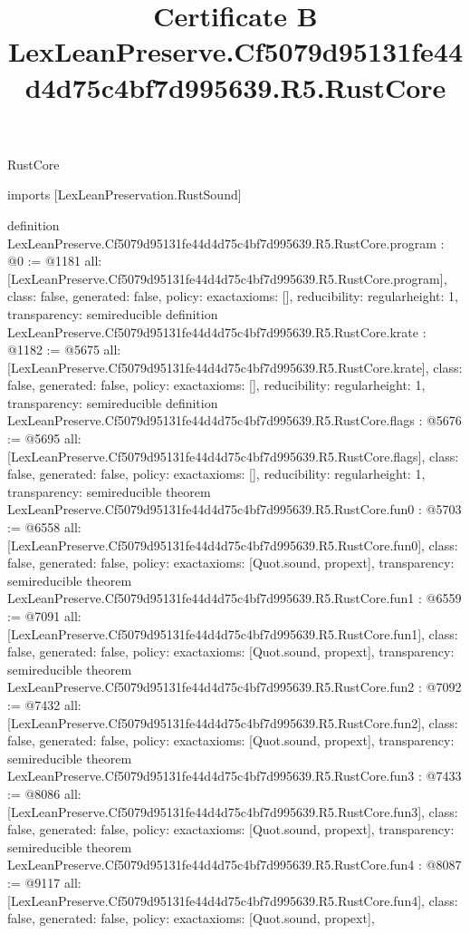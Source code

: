 \begin{lexlean}{RustCore}
\title{Certificate B LexLeanPreserve.Cf5079d95131fe44d4d75c4bf7d995639.R5.RustCore}
\begin{coremodule}
imports [LexLeanPreservation.RustSound]

definition LexLeanPreserve.Cf5079d95131fe44d4d75c4bf7d995639.R5.RustCore.program : @0 := @1181 {
  all: [LexLeanPreserve.Cf5079d95131fe44d4d75c4bf7d995639.R5.RustCore.program],
  class: false,
  generated: false,
  policy: exact{axioms: []},
  reducibility: regular{height: 1},
  transparency: semireducible
}
definition LexLeanPreserve.Cf5079d95131fe44d4d75c4bf7d995639.R5.RustCore.krate : @1182 := @5675 {
  all: [LexLeanPreserve.Cf5079d95131fe44d4d75c4bf7d995639.R5.RustCore.krate],
  class: false,
  generated: false,
  policy: exact{axioms: []},
  reducibility: regular{height: 1},
  transparency: semireducible
}
definition LexLeanPreserve.Cf5079d95131fe44d4d75c4bf7d995639.R5.RustCore.flags : @5676 := @5695 {
  all: [LexLeanPreserve.Cf5079d95131fe44d4d75c4bf7d995639.R5.RustCore.flags],
  class: false,
  generated: false,
  policy: exact{axioms: []},
  reducibility: regular{height: 1},
  transparency: semireducible
}
theorem LexLeanPreserve.Cf5079d95131fe44d4d75c4bf7d995639.R5.RustCore.fun0 : @5703 := @6558 {
  all: [LexLeanPreserve.Cf5079d95131fe44d4d75c4bf7d995639.R5.RustCore.fun0],
  class: false,
  generated: false,
  policy: exact{axioms: [Quot.sound, propext]},
  transparency: semireducible
}
theorem LexLeanPreserve.Cf5079d95131fe44d4d75c4bf7d995639.R5.RustCore.fun1 : @6559 := @7091 {
  all: [LexLeanPreserve.Cf5079d95131fe44d4d75c4bf7d995639.R5.RustCore.fun1],
  class: false,
  generated: false,
  policy: exact{axioms: [Quot.sound, propext]},
  transparency: semireducible
}
theorem LexLeanPreserve.Cf5079d95131fe44d4d75c4bf7d995639.R5.RustCore.fun2 : @7092 := @7432 {
  all: [LexLeanPreserve.Cf5079d95131fe44d4d75c4bf7d995639.R5.RustCore.fun2],
  class: false,
  generated: false,
  policy: exact{axioms: [Quot.sound, propext]},
  transparency: semireducible
}
theorem LexLeanPreserve.Cf5079d95131fe44d4d75c4bf7d995639.R5.RustCore.fun3 : @7433 := @8086 {
  all: [LexLeanPreserve.Cf5079d95131fe44d4d75c4bf7d995639.R5.RustCore.fun3],
  class: false,
  generated: false,
  policy: exact{axioms: [Quot.sound, propext]},
  transparency: semireducible
}
theorem LexLeanPreserve.Cf5079d95131fe44d4d75c4bf7d995639.R5.RustCore.fun4 : @8087 := @9117 {
  all: [LexLeanPreserve.Cf5079d95131fe44d4d75c4bf7d995639.R5.RustCore.fun4],
  class: false,
  generated: false,
  policy: exact{axioms: [Quot.sound, propext]},
}
\end{coremodule}
\end{lexlean}
